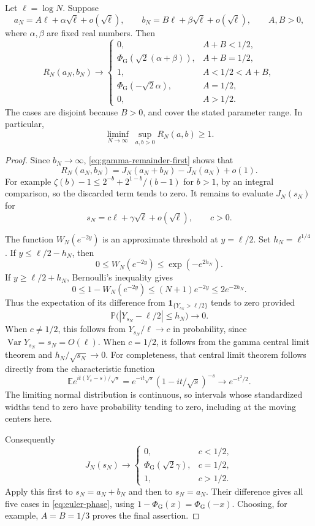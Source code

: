 \begin{theorem}
\label{thm:euler-moving}
Let $\ell=\log N$. Suppose
\[
 a_N=A\ell+\alpha\sqrt{\ell}+o(\sqrt{\ell}),\qquad
 b_N=B\ell+\beta\sqrt{\ell}+o(\sqrt{\ell}),
 \qquad A,B>0,
\]
where $\alpha,\beta$ are fixed real numbers. Then
\begin{equation}\label{eq:euler-phase}
 R_N(a_N,b_N)\longrightarrow
 \begin{cases}
  0,& A+B<1/2,\\
  \Phi_{\mathrm G}(\sqrt2(\alpha+\beta)),&A+B=1/2,\\
  1,&A<1/2<A+B,\\
  \Phi_{\mathrm G}(-\sqrt2\alpha),&A=1/2,\\
  0,&A>1/2.
 \end{cases}
\end{equation}
The cases are disjoint because $B>0$, and cover the stated
parameter range. In particular,
\[
 \liminf_{N\to\infty}\ \sup_{a,b>0}R_N(a,b)\geq1.
\]
\end{theorem}
\begin{proof}
Since $b_N\to\infty$, \eqref{eq:gamma-remainder-first}
shows that
\[
 R_N(a_N,b_N)=J_N(a_N+b_N)-J_N(a_N)+o(1).
\]
For example $\zeta(b)-1\leq2^{-b}+2^{1-b}/(b-1)$ for
$b>1$, by an integral comparison, so the discarded term
tends to zero. It remains to evaluate $J_N(s_N)$ for
\[
 s_N=c\ell+\gamma\sqrt{\ell}+o(\sqrt{\ell}),\qquad c>0.
\]

The function $W_N(e^{-2y})$ is an approximate threshold at
$y=\ell/2$. Set $h_N=\ell^{1/4}$. If
$y\leq\ell/2-h_N$, then
\[
 0\leq W_N(e^{-2y})\leq\exp(-e^{2h_N}).
\]
If $y\geq\ell/2+h_N$, Bernoulli's inequality gives
\[
 0\leq1-W_N(e^{-2y})
 \leq(N+1)e^{-2y}\leq2e^{-2h_N}.
\]
Thus the expectation of its difference from
$\mathbf1_{\{Y_{s_N}>\ell/2\}}$ tends to zero provided
\[
 \mathbb P\bigl(|Y_{s_N}-\ell/2|\leq h_N\bigr)\to0.
\]
When $c\ne1/2$, this follows from
$Y_{s_N}/\ell\to c$ in probability, since
$\operatorname{Var}Y_{s_N}=s_N=O(\ell)$.
When $c=1/2$, it follows from the gamma central limit
theorem and $h_N/\sqrt{s_N}\to0$.
For completeness, that central limit theorem follows
directly from the characteristic function
\[
 \mathbb E e^{it(Y_s-s)/\sqrt{s}}
 =e^{-it\sqrt{s}}(1-it/\sqrt{s})^{-s}
 \longrightarrow e^{-t^2/2}.
\]
The limiting normal distribution is continuous, so intervals
whose standardized widths tend to zero have probability
tending to zero, including at the moving centers here.

Consequently
\[
 J_N(s_N)\longrightarrow
 \begin{cases}
 0,&c<1/2,\\
 \Phi_{\mathrm G}(\sqrt2\gamma),&c=1/2,\\
 1,&c>1/2.
 \end{cases}
\]
Apply this first to $s_N=a_N+b_N$ and then to $s_N=a_N$.
Their difference gives all five cases in
\eqref{eq:euler-phase}, using
$1-\Phi_{\mathrm G}(x)=\Phi_{\mathrm G}(-x)$.
Choosing, for example, $A=B=1/3$ proves the final assertion.
\end{proof}

